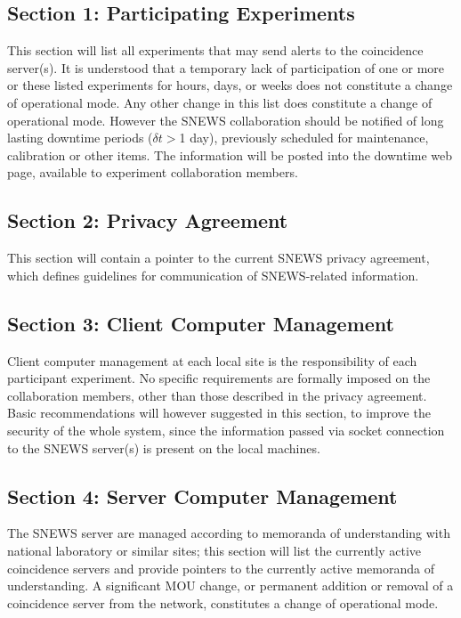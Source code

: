 \documentclass{article}
\begin{document}
\subsection*{Section 1: Participating Experiments}

This section will list all experiments that may send alerts to the
coincidence server(s).  It is understood that a temporary lack of
participation of one or more or these listed experiments for hours,
days, or weeks does not constitute a change of operational mode.  Any
other change in this list does constitute a change of operational
mode. However the SNEWS collaboration should be notified of long
lasting downtime periods ($\delta t>$1 day), previously scheduled for
maintenance, calibration or other items. The information will be
posted into the downtime web page, available to experiment collaboration
members.

\subsection*{Section 2: Privacy Agreement}
This section will contain a pointer to the current SNEWS privacy
agreement, which defines guidelines for communication
of SNEWS-related information.

\subsection*{Section 3: Client Computer Management}

Client computer management at each local site is the responsibility of
each participant experiment. No specific requirements are formally
imposed on the collaboration members, other than those described in
the privacy agreement. Basic recommendations will however suggested
in this section, to improve the security of the whole system, since the
information passed via socket connection to the SNEWS server(s) is
present on the local machines.


\subsection*{Section 4: Server Computer Management}

The SNEWS server are managed according to memoranda
of understanding with national laboratory or similar sites;
this section will list the currently active coincidence
servers and provide pointers to the currently active memoranda
of understanding.  A significant MOU change, or permanent addition
or removal of a coincidence server from the network,  
constitutes a change of operational mode.
\end{document}
